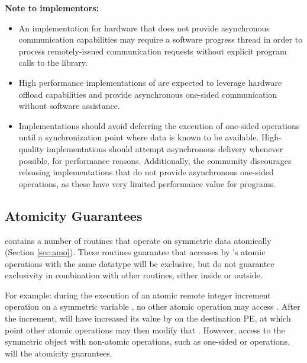 \textbf{Note to implementors:}
\begin{itemize}
  \item An \openshmem implementation for hardware that does not provide
      asynchronous communication capabilities may require a software progress
      thread in order to process remotely-issued communication requests without
      explicit program calls to the \openshmem library.  
  \item High performance implementations of \openshmem are expected to leverage
      hardware offload capabilities and provide asynchronous one-sided
      communication without software assistance.
  \item Implementations should avoid deferring the execution of one-sided
      operations until a synchronization point where data is known to be
      available. High-quality implementations should attempt asynchronous delivery
      whenever possible, for performance reasons. Additionally, the \openshmem
      community discourages releasing \openshmem implementations that do not
      provide asynchronous one-sided operations, as these have very limited
      performance value for \openshmem programs.
\end{itemize}

\subsection{Atomicity Guarantees}\label{sec:amo_guarantees}

\openshmem contains a number of routines that operate on symmetric data
atomically (Section \ref{sec:amo}).  These routines guarantee that accesses by
\openshmem's atomic operations with the same datatype will be exclusive, but do not guarantee
exclusivity in combination with other routines, either inside \openshmem or
outside.

For example: during the execution of an atomic remote integer increment
operation on a symmetric variable , no other \openshmem atomic operation
may access .  After the increment,  will have increased its value
by  on the destination \ac{PE}, at which point other atomic operations
may then modify that .  However, access to the symmetric object 
with non-atomic operations, such as one-sided  or  operations,
will  the atomicity guarantees.

